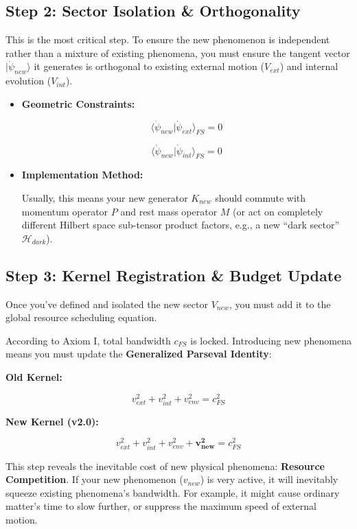 \documentclass[11pt,a4paper,twoside]{book}
\begin{document}
\subsection{Step 2: Sector Isolation \& Orthogonality}

This is the most critical step. To ensure the new phenomenon is independent rather than a mixture of existing phenomena, you must ensure the tangent vector \textbf{$|\dot{\psi}_{new}\rangle$} it generates is orthogonal to existing external motion (\textbf{$V_{ext}$}) and internal evolution (\textbf{$V_{int}$}).

\begin{itemize}
\item \textbf{Geometric Constraints:}

$$\langle \dot{\psi}_{new} | \dot{\psi}_{ext} \rangle_{FS} = 0$$

$$\langle \dot{\psi}_{new} | \dot{\psi}_{int} \rangle_{FS} = 0$$

\item \textbf{Implementation Method:}

Usually, this means your new generator \textbf{$K_{new}$} should commute with momentum operator \textbf{$P$} and rest mass operator \textbf{$M$} (or act on completely different Hilbert space sub-tensor product factors, e.g., a new ``dark sector'' $\mathcal{H}_{dark}$).
\end{itemize}

\subsection{Step 3: Kernel Registration \& Budget Update}

Once you've defined and isolated the new sector \textbf{$V_{new}$}, you must add it to the global resource scheduling equation.

According to Axiom I, total bandwidth \textbf{$c_{FS}$} is locked. Introducing new phenomena means you must update the \textbf{Generalized Parseval Identity}:

\textbf{Old Kernel:}

$$v_{ext}^2 + v_{int}^2 + v_{env}^2 = c_{FS}^2$$

\textbf{New Kernel (v2.0):}

$$v_{ext}^2 + v_{int}^2 + v_{env}^2 + \mathbf{v_{new}^2} = c_{FS}^2$$

This step reveals the inevitable cost of new physical phenomena: \textbf{Resource Competition}. If your new phenomenon ($v_{new}$) is very active, it will inevitably squeeze existing phenomena's bandwidth. For example, it might cause ordinary matter's time to slow further, or suppress the maximum speed of external motion.
\end{document}
